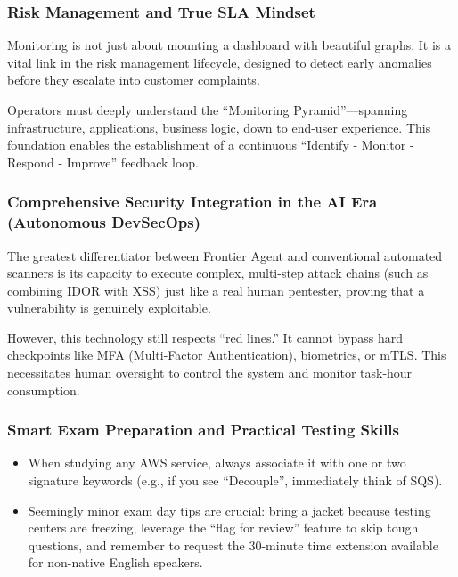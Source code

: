 \hypertarget{risk-management-and-true-sla-mindset}{%
\subsubsection{Risk Management and True SLA
Mindset}}

Monitoring is not just about mounting a dashboard with beautiful graphs.
It is a vital link in the risk management lifecycle, designed to detect
early anomalies before they escalate into customer complaints.

Operators must deeply understand the ``Monitoring Pyramid''---spanning
infrastructure, applications, business logic, down to end-user
experience. This foundation enables the establishment of a continuous
``Identify - Monitor - Respond - Improve'' feedback loop.

\hypertarget{comprehensive-security-integration-in-the-ai-era-autonomous-devsecops}{%
\subsubsection{Comprehensive Security Integration in the AI Era
(Autonomous
DevSecOps)}}

The greatest differentiator between Frontier Agent and conventional
automated scanners is its capacity to execute complex, multi-step attack
chains (such as combining IDOR with XSS) just like a real human
pentester, proving that a vulnerability is genuinely exploitable.

However, this technology still respects ``red lines.'' It cannot bypass
hard checkpoints like MFA (Multi-Factor Authentication), biometrics, or
mTLS. This necessitates human oversight to control the system and
monitor task-hour consumption.

\hypertarget{smart-exam-preparation-and-practical-testing-skills}{%
\subsubsection{Smart Exam Preparation and Practical Testing
Skills}}

\begin{itemize}
\tightlist
\item
  When studying any AWS service, always associate it with one or two
  signature keywords (e.g., if you see ``Decouple'', immediately think
  of SQS).
\item
  Seemingly minor exam day tips are crucial: bring a jacket because
  testing centers are freezing, leverage the ``flag for review'' feature
  to skip tough questions, and remember to request the 30-minute time
  extension available for non-native English speakers.
\end{itemize}

